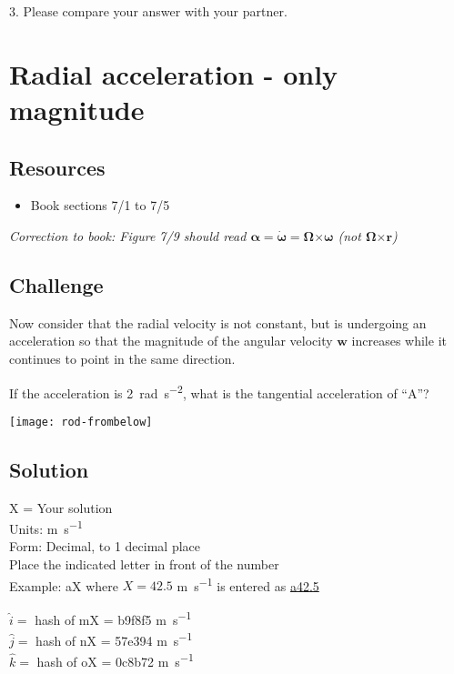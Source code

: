 3. Please compare your answer with your partner.




\newpage
\section{Radial acceleration - only magnitude}

\subsection*{Resources}
\begin{itemize}
    \item Book sections 7/1 to 7/5
\end{itemize}

\emph{Correction to book: Figure 7/9 should read $\bm{\alpha} = \bm{\dot{\omega}} = \bm{\Omega} \bm{\times} \bm{\omega}$ (not $\bm{\Omega} \bm{\times} \bm{r}$)}

\subsection*{Challenge}
Now consider that the radial velocity is not constant, but is undergoing an acceleration so that the magnitude of the angular velocity $\bm{w}$ increases while it continues to point in the same direction.

If the acceleration is \SI{2}{\radian\per\square\second}, what is the tangential acceleration of ``A''?

\texttt{[image: rod-frombelow]}

\subsection*{Solution}
X = Your solution\\
Units: \si{\meter\per\second}\\
Form: Decimal, to 1 decimal place\\
Place the indicated letter in front of the number\\
Example: aX where $X=42.5$ \si{\meter\per\second} is entered as \href{http://www.wolframalpha.com/input/?i=md5+hash+of+\%22a42.5\%22}{a42.5}

$\hat{i}=$ hash of mX = b9f8f5 \si{\meter\per\second}\\
$\hat{j}=$ hash of nX = 57e394 \si{\meter\per\second}\\
$\hat{k}=$ hash of oX = 0c8b72 \si{\meter\per\second}





